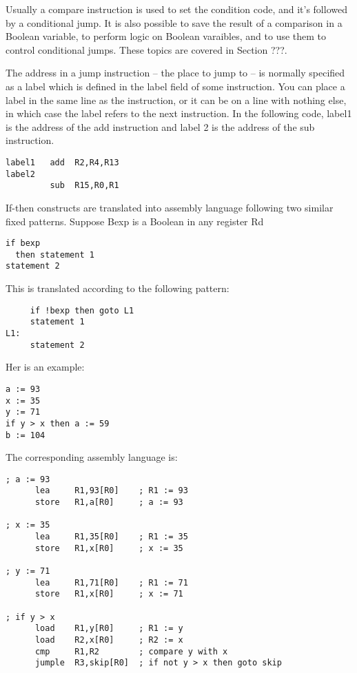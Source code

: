 \documentclass[11pt]{article}
\begin{document}
\begin{itemize}
Usually a compare instruction is used to set the condition code, and
it's followed by a conditional jump.  It is also possible to save the
result of a comparison in a Boolean variable, to perform logic on
Boolean varaibles, and to use them to control conditional jumps.
These topics are covered in Section ???.

The address in a jump instruction -- the place to jump to -- is
normally specified as a label which is defined in the label field of
some instruction.  You can place a label in the same line as the
instruction, or it can be on a line with nothing else, in which case
the label refers to the next instruction.  In the following code,
label1 is the address of the add instruction and label 2 is the
address of the sub instruction.

\begin{verbatim}
label1   add  R2,R4,R13
label2
         sub  R15,R0,R1
\end{verbatim}

If-then constructs are translated into assembly language following two
similar fixed patterns.  Suppose Bexp is a Boolean in any register Rd

\begin{verbatim}
if bexp
  then statement 1
statement 2
\end{verbatim}


This is translated according to the following pattern:


\begin{verbatim}
     if !bexp then goto L1
     statement 1
L1:
     statement 2
\end{verbatim}


Her is an example:

\begin{verbatim}
a := 93
x := 35
y := 71
if y > x then a := 59
b := 104
\end{verbatim}

The corresponding assembly language is:

\begin{verbatim}
; a := 93
      lea     R1,93[R0]    ; R1 := 93
      store   R1,a[R0]     ; a := 93

; x := 35
      lea     R1,35[R0]    ; R1 := 35
      store   R1,x[R0]     ; x := 35

; y := 71
      lea     R1,71[R0]    ; R1 := 71
      store   R1,x[R0]     ; x := 71

; if y > x
      load    R1,y[R0]     ; R1 := y
      load    R2,x[R0]     ; R2 := x
      cmp     R1,R2        ; compare y with x
      jumple  R3,skip[R0]  ; if not y > x then goto skip


\end{verbatim}
\end{itemize}
\end{document}
